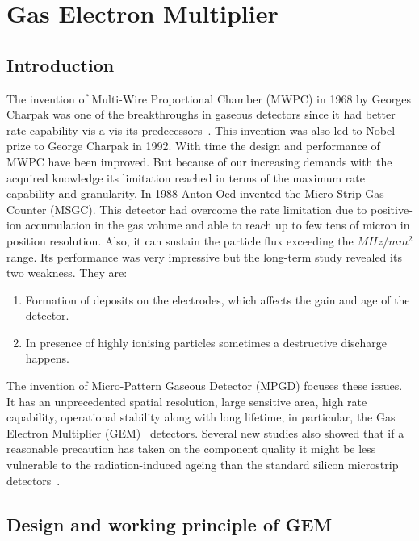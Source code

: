 \chapter{Gas Electron Multiplier} %
\label{cha:gas_electron_multiplier}

\section{Introduction} %
\label{sec:introduction}
The invention of Multi-Wire Proportional Chamber (MWPC) in 1968 by Georges Charpak was one of the breakthroughs in gaseous detectors since it had better rate capability vis-a-vis its predecessors~\cite{Charpak1968}. 
This invention was also led to Nobel prize to George Charpak in 1992. With time the design and performance of MWPC have been improved. But because of our increasing demands with the acquired knowledge its limitation reached in terms of the maximum rate capability and granularity. In 1988 Anton Oed invented the Micro-Strip Gas Counter (MSGC). 
This detector had overcome the rate limitation due to positive-ion accumulation in the gas volume and able to reach up to few tens of micron in position resolution. 
Also, it can sustain the particle flux exceeding the $MHz/mm^2$ range. Its performance was very impressive but the long-term study revealed its two weakness. They are:
\begin{enumerate}
	\item Formation of deposits on the electrodes, which affects the gain and age of the detector.
	\item In presence of highly ionising particles sometimes a destructive discharge happens.
\end{enumerate}
The invention of Micro-Pattern Gaseous Detector (MPGD) focuses these issues. 
It has an unprecedented spatial resolution, large sensitive area, high rate capability, operational stability along with long lifetime, in particular, the Gas Electron Multiplier (GEM)~\cite{Sauli1997,Sauli1999,detector:1732870} detectors. 
Several new studies also showed that if a reasonable precaution has taken on the component quality it might be less vulnerable to the radiation-induced ageing than the standard silicon microstrip detectors~\cite{TITOV2004,Titov2002}.

\section{Design and working principle of GEM} %
\label{sec:design_and_working_principle_of_gem}

